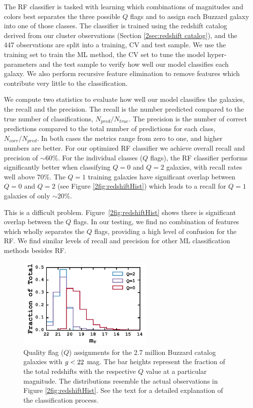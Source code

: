 The RF classifier is tasked with learning which combinations of magnitudes and colors best separates the three possible $Q$ flags and to assign each Buzzard galaxy into one of those classes. The classifier is trained using the redshift catalog derived from our cluster observations (Section \ref{2sec:redshift catalog}), and the 447 observations are split into a training, CV and test sample. We use the training set to train the ML method, the CV set to tune the model hyper-parameters and the test sample to verify how well our model classifies each galaxy. We also perform recursive feature elimination to remove features which contribute very little to the classification.

We compute two statistics to evaluate how well our model classifies the galaxies, the recall and the precision. The recall is the number predicted compared to the true number of classifications, $N_{pred}/N_{true}$. The precision is the number of correct predictions compared to the total number of predictions for each class, $N_{corr}/N_{pred}$. In both cases the metrics range from zero to one, and higher numbers are better. For our optimized RF classifier we achieve overall recall and precision of $\sim60\%$. For the individual classes ($Q$ flags), the RF classifier performs significantly better when classifying $Q=0$ and $Q=2$ galaxies, with recall rates well above 70\%. The $Q=1$ training galaxies have significant overlap between $Q=0$ and $Q=2$ (see Figure \ref{2fig:redshiftHist}) which leads to a recall for $Q=1$ galaxies of only $\sim20\%$. 

This is a difficult problem. Figure~\ref{2fig:redshiftHist} shows there is significant overlap between the $Q$ flags. In our testing, we find no combination of features which wholly separates the $Q$ flags, providing a high level of confusion for the RF. We find similar levels of recall and precision for other ML classification methods besides RF.

\begin{figure}[t]
	\begin{center}
		\includegraphics[width=0.6\textwidth]{figures2/buzzardQHist.pdf}
	\end{center}
	\caption[Quality flag assignments for the 2.7 million Buzzard catalog galaxies]{Quality flag ($Q$) assignments for the 2.7 million Buzzard catalog galaxies with $\hbox{$g$}< 22$ mag. The bar heights represent the fraction of the total redshifts with the respective $Q$ value at a particular magnitude. The distributions resemble the actual observations in Figure \ref{2fig:redshiftHist}. See the text for a detailed explanation of the classification process.} \label{2fig:buzzardHist} 
\end{figure}

